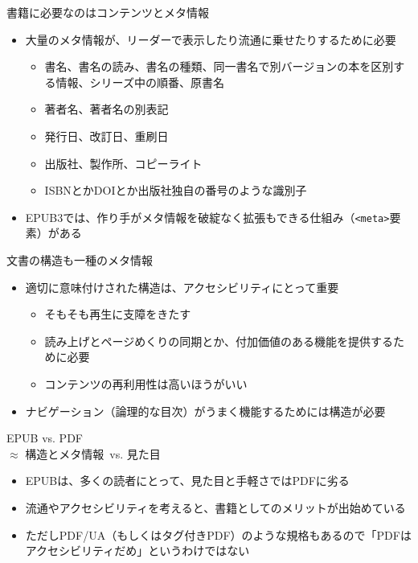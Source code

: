 \begin{frame}[t]{\inhibitglue 書籍に必要なのはコンテンツとメタ情報}
  \sffamily

  \begin{itemize}
    \item 大量のメタ情報が、リーダーで表示したり流通に乗せたりするために必要\\
    \begin{itemize}
      \item 書名、書名の読み、書名の種類、同一書名で別バージョンの本を区別する情報、シリーズ中の順番、原書名
      \item 著者名、著者名の別表記
      \item 発行日、改訂日、重刷日
      \item 出版社、製作所、コピーライト
      \item ISBNとかDOIとか出版社独自の番号のような識別子
    \end{itemize}
    \item EPUB3では、作り手がメタ情報を破綻なく拡張もできる仕組み（\texttt{<meta>}要素）がある
  \end{itemize}
\end{frame}

\begin{frame}[t]{\inhibitglue 文書の構造も一種のメタ情報}
  \sffamily

  \begin{itemize}
    \item 適切に意味付けされた構造は、アクセシビリティにとって重要\\
    \begin{itemize}
      \item そもそも再生に支障をきたす
      \item 読み上げとページめくりの同期とか、付加価値のある機能を提供するために必要
      \item コンテンツの再利用性は高いほうがいい
    \end{itemize}
    \item ナビゲーション（論理的な目次）がうまく機能するためには構造が必要
  \end{itemize}
\end{frame}

\begin{frame}[t]{\inhibitglue EPUB vs. PDF \\ $\approx$ 構造とメタ情報\, vs. 見た目}
  \sffamily

  \begin{itemize}
    \item EPUBは、多くの読者にとって、見た目と手軽さではPDFに劣る
    \item 流通やアクセシビリティを考えると、書籍としてのメリットが出始めている
  \end{itemize}
  \pause
  \begin{itemize}
    \item ただしPDF/UA（もしくはタグ付きPDF）のような規格もあるので「PDFはアクセシビリティだめ」というわけではない
  \end{itemize}
\end{frame}

